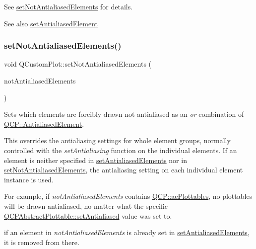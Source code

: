 See \hyperlink{class_q_custom_plot_ae10d685b5eabea2999fb8775ca173c24}{set\+Not\+Antialiased\+Elements} for details.

\begin{DoxySeeAlso}{See also}
\hyperlink{class_q_custom_plot_aeef813bcf7efab8e765f9f87ec454691}{set\+Antialiased\+Element} 
\end{DoxySeeAlso}
\mbox{\label{class_q_custom_plot_ae10d685b5eabea2999fb8775ca173c24}} 
\subsubsection{\texorpdfstring{set\+Not\+Antialiased\+Elements()}{setNotAntialiasedElements()}}
{\footnotesize\ttfamily void Q\+Custom\+Plot\+::set\+Not\+Antialiased\+Elements (\begin{DoxyParamCaption}\item[{const Q\+C\+P\+::\+Antialiased\+Elements \&}]{not\+Antialiased\+Elements }\end{DoxyParamCaption})}

Sets which elements are forcibly drawn not antialiased as an {\itshape or} combination of \hyperlink{namespace_q_c_p_ae55dbe315d41fe80f29ba88100843a0c}{Q\+C\+P\+::\+Antialiased\+Element}.

This overrides the antialiasing settings for whole element groups, normally controlled with the {\itshape set\+Antialiasing} function on the individual elements. If an element is neither specified in \hyperlink{class_q_custom_plot_af6f91e5eab1be85f67c556e98c3745e8}{set\+Antialiased\+Elements} nor in \hyperlink{class_q_custom_plot_ae10d685b5eabea2999fb8775ca173c24}{set\+Not\+Antialiased\+Elements}, the antialiasing setting on each individual element instance is used.

For example, if {\itshape not\+Antialiased\+Elements} contains \hyperlink{namespace_q_c_p_ae55dbe315d41fe80f29ba88100843a0ca4145e4251b0cf2dbedabeea0a38f84f6}{Q\+C\+P\+::ae\+Plottables}, no plottables will be drawn antialiased, no matter what the specific \hyperlink{class_q_c_p_layerable_a4fd43e89be4a553ead41652565ff0581}{Q\+C\+P\+Abstract\+Plottable\+::set\+Antialiased} value was set to.

if an element in {\itshape not\+Antialiased\+Elements} is already set in \hyperlink{class_q_custom_plot_af6f91e5eab1be85f67c556e98c3745e8}{set\+Antialiased\+Elements}, it is removed from there.

